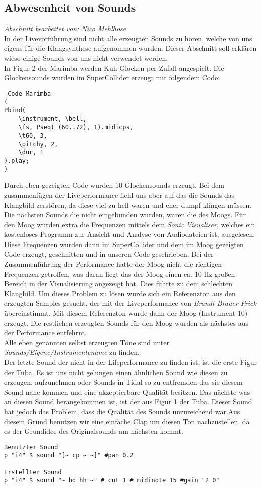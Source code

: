\documentclass[
10pt, %
a4paper, %
oneside, %
headinclude,footinclude, %
BCOR5mm, %
]{scrartcl}
\begin{document}
\subsection{Abwesenheit von Sounds}
\textit{Abschnitt bearbeitet von: Nico Mehlhose}\\
In der Livevorführung sind nicht alle erzeugten Sounds zu hören, welche von uns eigens für die Klangsynthese aufgenommen wurden. Dieser Abschnitt soll erklären wieso einige Sounds von uns nicht verwendet werden.\\
In Figur 2 der Marimba werden Kuh-Glocken per Zufall angespielt. Die Glockensounds wurden im SuperCollider erzeugt mit folgendem Code:
\begin{lstlisting}
-Code Marimba-
(
Pbind(
	\instrument, \bell,
	\fs, Pseq( (60..72), 1).midicps,
	\t60, 3,
	\pitchy, 2,
	\dur, 1
).play;
)
\end{lstlisting}
Durch eben gezeigten Code wurden 10 Glockensounds erzeugt. Bei dem zusammenfügen der Liveperformance fiehl uns aber auf das die Sounds das Klangbild zerstören, da diese viel zu hell waren und eher dumpf klingen müssen.\\
Die nächsten Sounds die nicht eingebunden wurden, waren die des Moogs. Für den Moog wurden extra die Frequenzen mittels dem \textit{Sonic Visualiser}, welches ein kostenloses Programm zur Ansicht und Analyse von Audiodateien ist, ausgelesen.\cite{Sonic} Diese Frequenzen wurden dann im SuperCollider und dem im Moog gezeigten Code erzeugt, geschnitten und in unseren Code geschrieben. Bei der Zusammenführung der Performance hatte der Moog nicht die richtigen Frequenzen getroffen, was daran liegt das der Moog einen ca. 10 Hz großen Bereich in der Visualisierung angezeigt hat. Dies führte zu dem schlechten Klangbild. Um dieses Problem zu lösen wurde sich ein Referenzton aus den erzeugten Samples gesucht, der mit der Liveperformance von \textit{Brandt Brauer Frick} übereinstimmt. Mit diesem Referenzton wurde dann der Moog (Instrument 10) erzeugt. Die restlichen erzeugten Sounds für den Moog wurden als nächstes aus der Performance entfehrnt.\\
Alle eben genannten selbst erzeugten Töne sind unter \textit{Sounds/Eigene/Instrumentename} zu finden.\\
Der letzte Sound der nicht in der Lifeperformance zu finden ist, ist die erste Figur der Tuba. Es ist uns nicht gelungen einen ähnlichen Sound wie diesen zu erzeugen, aufzunehmen oder Sounds in Tidal so zu entfremden das sie diesem Sound nahe kommen und eine akzeptierbare Qualität besitzen. Das nächste was an diesen Sound herangekommen ist, ist der aus Figur 1 der Tuba. Dieser Sound hat jedoch das Problem, dass die Qualität des Sounds unzureichend war.Aus diesem Grund benutzen wir eine einfache Clap um diesen Ton nachzustellen, da es der Grundidee des Originalsounds am nächsten kommt.
\begin{lstlisting}
Benutzter Sound
p "i4" $ sound "[~ cp ~ ~]" #pan 0.2

Erstellter Sound
p "i4" $ sound "~ bd hh ~" # cut 1 # midinote 15 #gain "2 0"

\end{lstlisting}
\end{document}
